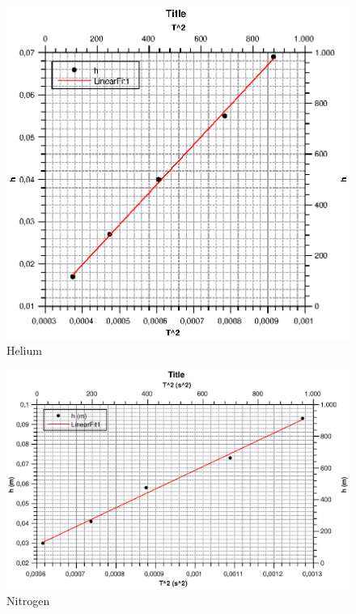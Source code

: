 \documentclass{scrartcl}
\begin{document}
\begin{figure}
    \centering
    \includegraphics{Graph7.eps}
    \caption{Helium}
    \label{fig:my_label}
\end{figure}

\begin{figure}[h]
    \centering
    \includegraphics[width=12cm]{Graph5.eps}
    \caption{Nitrogen}
    \label{fig:my_label}
\end{figure}
\end{document}
